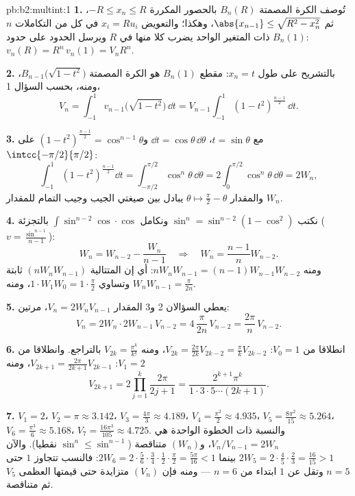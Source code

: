 \begin{solution}{pb:b2:multint:1}
\textbf{1.} تُوصف الكرة المصمتة $B_n(R)$ بالحصور المكررة $-R \leq x_n \leq R$، ثم
$\abs{x_{n-1}} \leq \sqrt{R^2 -
x_n^2}$، وهكذا؛ والتعويض $x_i = Ru_i$ في كل من التكاملات $n$ ذات
المتغير الواحد يضرب كلا منها في $R$ ويرسل الحدود على حدود $B_n(1)$:
$v_n(R) = R^n\,v_n(1) =
V_nR^n$.

\textbf{2.} بالتشريح على طول $x_n = t$: مقطع $B_n(1)$ هو الكرة المصمتة
$B_{n-1}\bigl(\sqrt{1 - t^2}\bigr)$، ومنه، بحسب السؤال 1،
\[
V_n = \int_{-1}^1 v_{n-1}\bigl(\sqrt{1 - t^2}\bigr)\,\dd t
= V_{n-1}\int_{-1}^{1}(1 - t^2)^{\frac{n-1}2}\,\dd t .
\]

\textbf{3.} مع $t = \sin\theta$، $\dd t =
\cos\theta\,\dd\theta$ و$(1 - t^2)^{\frac{n-1}2} =
\cos^{n-1}\theta$ على $\intcc{-\pi/2}{\pi/2}$:
\[
\int_{-1}^1(1 - t^2)^{\frac{n-1}2}\dd t
= \int_{-\pi/2}^{\pi/2}\cos^n\theta\,\dd\theta
= 2\int_0^{\pi/2}\cos^n\theta\,\dd\theta = 2W_n,
\]
والمقدار $\theta \mapsto \frac\pi2 - \theta$ يبادل بين صيغتي الجيب وجيب التمام للمقدار $W_n$.

\textbf{4.} نكتب $\sin^n = \sin^{n-2}(1 - \cos^2)$ ونكامل $\int\sin^{n-2}\cos\cdot\cos$ بالتجزئة ($v =
\frac{\sin^{n-1}}{n-1}$):
\[
W_n = W_{n-2} - \frac{W_n}{n-1}
\quad\Longrightarrow\quad
W_n = \frac{n-1}{n}W_{n-2}.
\]
ومنه $nW_nW_{n-1} = (n-1)W_{n-1}W_{n-2}$: أي إن المتتالية $(nW_nW_{n-1})$ ثابتة وتساوي $1\cdot W_1W_0 =
1\cdot\frac\pi2$، ومنه
$W_nW_{n-1} = \frac{\pi}{2n}$.

\textbf{5.} يعطي السؤالان 2 و3 المقدار $V_n = 2W_nV_{n-1}$، مرتين:
\[
V_n = 2W_n\cdot 2W_{n-1}\,V_{n-2}
= 4\,\frac{\pi}{2n}\,V_{n-2} = \frac{2\pi}n\,V_{n-2}.
\]

\textbf{6.} انطلاقا من $V_0 = 1$: $V_{2k} = \frac{2\pi}{2k}V_{2k-2}
= \frac\pi kV_{2k-2}$، ومنه $V_{2k} = \frac{\pi^k}{k!}$ بالتراجع.
وانطلاقا من $V_1 = 2$: $V_{2k+1} =
\frac{2\pi}{2k+1}V_{2k-1}$، ومنه
\[
V_{2k+1} = 2\prod_{j=1}^k\frac{2\pi}{2j+1}
= \frac{2^{k+1}\pi^k}{1\cdot3\cdot5\cdots(2k+1)} .
\]

\textbf{7.} $V_1 = 2$، $V_2 = \pi \approx 3.142$، $V_3 =
\frac{4\pi}3 \approx 4.189$، $V_4 = \frac{\pi^2}2 \approx
4.935$، $V_5 = \frac{8\pi^2}{15} \approx 5.264$، $V_6 =
\frac{\pi^3}6 \approx 5.168$،
$V_7 = \frac{16\pi^3}{105}
\approx 4.725$. والنسبة ذات الخطوة الواحدة هي $V_n/V_{n-1} = 2W_n$، و$(W_n)$ متناقصة
($\sin^n \leq \sin^{n-1}$ نقطيا). والآن $2W_5 = 2\cdot\frac45\cdot\frac23 =
\frac{16}{15} > 1$ بينما $2W_6 =
2\cdot\frac56\cdot\frac34\cdot\frac12\cdot\frac\pi2 =
\frac{5\pi}{16} < 1$: فالنسب تتجاوز $1$
حتى $n = 5$ وتقل عن $1$ ابتداء من $n = 6$ --- ومنه فإن $(V_n)$
متزايدة حتى قيمتها العظمى $V_5$ ثم متناقصة.


\end{solution}
